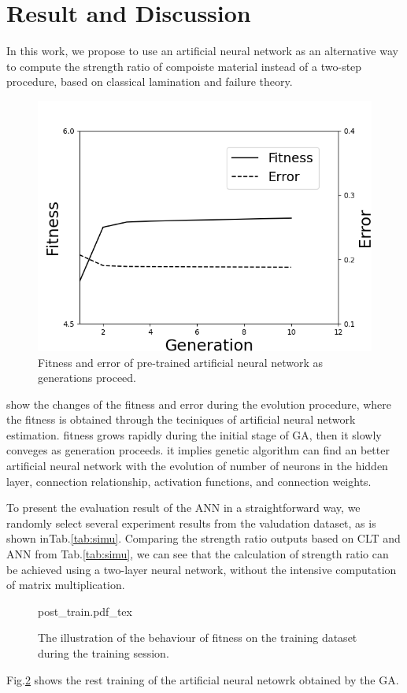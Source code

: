 \section{Result and Discussion}
In this work, we propose to use an artificial neural network as an alternative
way to compute the strength ratio of compoiste material instead of a two-step
procedure, based on classical lamination and failure theory. 

\begin{figure}[!tb]
	\includegraphics[width=0.9\linewidth]{./fig/result_ga_ann.png}
	\caption{Fitness and error of pre-trained artificial neural network as generations proceed.}
	\label{fig:ga_nn}
\end{figure}

show the changes of the fitness and error during the evolution procedure, where
the fitness is obtained through the teciniques of artificial neural network
estimation.
fitness grows rapidly during the initial stage of GA, then it slowly conveges as
generation proceeds. it implies genetic algorithm can find an better artificial
neural network with the evolution of number of neurons in the hidden layer,
connection relationship, activation functions, and connection weights.

To present the evaluation result of the ANN in a straightforward way, we
randomly select several experiment results from the valudation dataset, as is
shown inTab.\ref{tab:simu}.  Comparing the strength ratio outputs based on CLT
and ANN from Tab.\ref{tab:simu}, we can see that the calculation of strength
ratio can be achieved using a two-layer neural network, without the intensive
computation of matrix multiplication.


\begin{figure}
	\centering
	\def\svgwidth{\columnwidth}
	{post_train.pdf_tex}
	\caption{The illustration of the behaviour of fitness on the training dataset during the training session.}
	\label{fig:final_train}
\end{figure}

Fig.\ref{fig:final_train} shows the rest training of the artificial neural
netowrk obtained by the GA.






